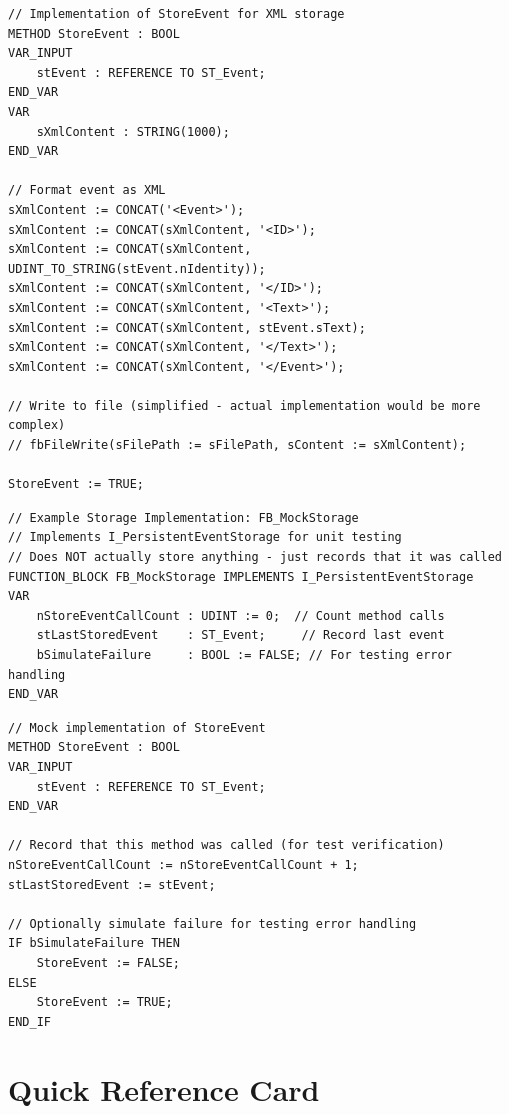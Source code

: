 \documentclass[11pt,a4paper]{article}
\begin{document}
\begin{lstlisting}
// Implementation of StoreEvent for XML storage
METHOD StoreEvent : BOOL
VAR_INPUT
    stEvent : REFERENCE TO ST_Event;
END_VAR
VAR
    sXmlContent : STRING(1000);
END_VAR

// Format event as XML
sXmlContent := CONCAT('<Event>');
sXmlContent := CONCAT(sXmlContent, '<ID>');
sXmlContent := CONCAT(sXmlContent, UDINT_TO_STRING(stEvent.nIdentity));
sXmlContent := CONCAT(sXmlContent, '</ID>');
sXmlContent := CONCAT(sXmlContent, '<Text>');
sXmlContent := CONCAT(sXmlContent, stEvent.sText);
sXmlContent := CONCAT(sXmlContent, '</Text>');
sXmlContent := CONCAT(sXmlContent, '</Event>');

// Write to file (simplified - actual implementation would be more complex)
// fbFileWrite(sFilePath := sFilePath, sContent := sXmlContent);

StoreEvent := TRUE;
\end{lstlisting}

\begin{lstlisting}
// Example Storage Implementation: FB_MockStorage
// Implements I_PersistentEventStorage for unit testing
// Does NOT actually store anything - just records that it was called
FUNCTION_BLOCK FB_MockStorage IMPLEMENTS I_PersistentEventStorage
VAR
    nStoreEventCallCount : UDINT := 0;  // Count method calls
    stLastStoredEvent    : ST_Event;     // Record last event
    bSimulateFailure     : BOOL := FALSE; // For testing error handling
END_VAR
\end{lstlisting}

\begin{lstlisting}
// Mock implementation of StoreEvent
METHOD StoreEvent : BOOL
VAR_INPUT
    stEvent : REFERENCE TO ST_Event;
END_VAR

// Record that this method was called (for test verification)
nStoreEventCallCount := nStoreEventCallCount + 1;
stLastStoredEvent := stEvent;

// Optionally simulate failure for testing error handling
IF bSimulateFailure THEN
    StoreEvent := FALSE;
ELSE
    StoreEvent := TRUE;
END_IF
\end{lstlisting}

\section*{Quick Reference Card}
\end{document}
